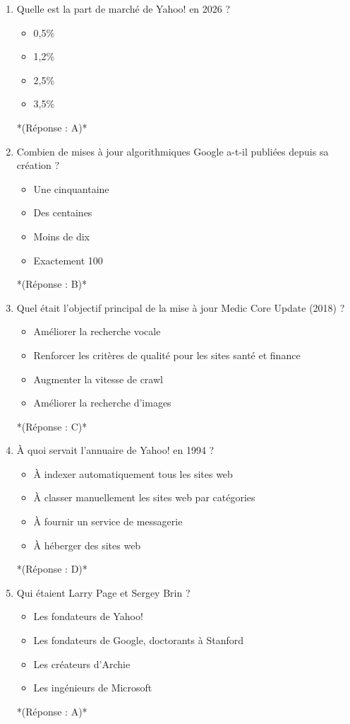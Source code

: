 \documentclass[12pt,a4paper,twoside]{report}
\begin{document}
\begin{enumerate}
\item Quelle est la part de marché de Yahoo! en 2026 ?
\begin{itemize}
\item[A)] 0,5\%
\item[B)] 1,2\%
\item[C)] 2,5\%
\item[D)] 3,5\%
\end{itemize}
*(Réponse : A)*

\item Combien de mises à jour algorithmiques Google a-t-il publiées depuis sa création ?
\begin{itemize}
\item[A)] Une cinquantaine
\item[B)] Des centaines
\item[C)] Moins de dix
\item[D)] Exactement 100
\end{itemize}
*(Réponse : B)*

\item Quel était l'objectif principal de la mise à jour Medic Core Update (2018) ?
\begin{itemize}
\item[A)] Améliorer la recherche vocale
\item[B)] Renforcer les critères de qualité pour les sites santé et finance
\item[C)] Augmenter la vitesse de crawl
\item[D)] Améliorer la recherche d'images
\end{itemize}
*(Réponse : C)*

\item À quoi servait l'annuaire de Yahoo! en 1994 ?
\begin{itemize}
\item[A)] À indexer automatiquement tous les sites web
\item[B)] À classer manuellement les sites web par catégories
\item[C)] À fournir un service de messagerie
\item[D)] À héberger des sites web
\end{itemize}
*(Réponse : D)*

\item Qui étaient Larry Page et Sergey Brin ?
\begin{itemize}
\item[A)] Les fondateurs de Yahoo!
\item[B)] Les fondateurs de Google, doctorants à Stanford
\item[C)] Les créateurs d'Archie
\item[D)] Les ingénieurs de Microsoft
\end{itemize}
*(Réponse : A)*


\end{enumerate}
\end{document}
